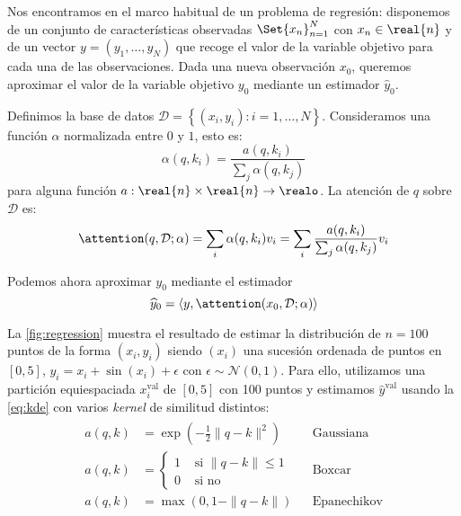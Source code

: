 Nos encontramos en el marco habitual de un problema de regresión: disponemos de un conjunto de características observadas \( \Set{x_{n}}_{n = 1}^N \) con \( x_{n}  \in \real{n} \) y de un vector \( y = (y_1, \dots, y_N) \) que recoge el valor de la variable objetivo para cada una de las observaciones. Dada una nueva observación \( x_{0} \), queremos aproximar el valor de la variable objetivo \( y_{0} \) mediante un estimador \( \widehat{y}_{0} \).

Definimos la base de datos \( \mathcal{D} = \left\{ (x_{i}, y_{i}) : i = 1, \dots, N \right\} \). Consideramos una función \( \alpha \) normalizada entre \( 0 \) y \( 1 \), esto es:
\[
    \alpha(q, k_{i}) = \frac{a(q, k_{i})}{\sum_j \alpha(q, k_{j}) }
\]
para alguna función \( a : \real{n} \times \real{n} \to \realo \). La atención de \( q \) sobre \( \mathcal{D} \) es:
\[
    \attention(q, \mathcal{D}; \alpha) = \sum_i  \alpha(q, k_{i}) v_{i} = \sum_i \frac{a(q, k_{i})}{\sum_j \alpha(q, k_{j})} v_{i}
\]

Podemos ahora aproximar \( y_{0} \) mediante el estimador 
\begin{equation}\label{eq:kde}
    \widehat{y}_{0} = \left\langle y, \attention(x_{0}, \mathcal{D}; \alpha) \right\rangle
\end{equation}

La \cref{fig:regression} muestra el resultado de estimar la distribución de \( n = 100 \) puntos de la forma \( (x_{i}, y_{i}) \) siendo \( (x_{i}) \) una sucesión ordenada de puntos en \( [0, 5] \), \( y_{i} = x_{i} + \sin(x_{i}) + \epsilon \) con \( \epsilon \sim \mathcal{N}(0, 1) \). Para ello, utilizamos una partición equiespaciada \( x^\text{val}_{i} \) de \( [0, 5] \) con 100 puntos y estimamos \( \widehat{y}^\text{val} \) usando la \cref{eq:kde} con varios \textit{kernel} de similitud distintos:
\[
    \begin{split}\begin{aligned}
    a(q, k) & = \exp\left(-\frac{1}{2} \|q - k\|^2 \right) && \mathrm{Gaussiana} \\
    a(q, k) & = \begin{cases}
        1 &\text{ si } \|q - k\| \leq 1 \\
        0 &\text{ si no}
    \end{cases} && \mathrm{Boxcar}
    \\
    a(q, k) & = \max\left(0, 1 - \|q - k\|\right) && \mathrm{Epanechikov}
    \end{aligned}\end{split}
\]

